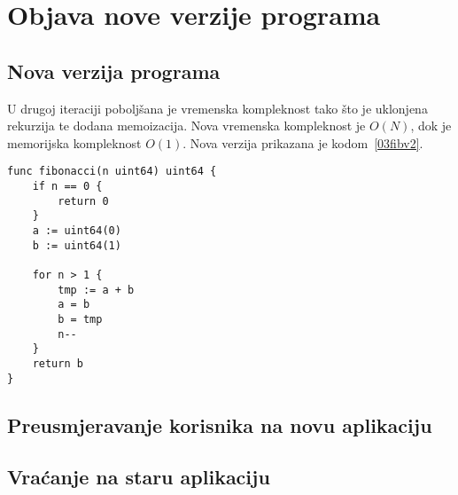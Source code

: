 \chapter{Objava nove verzije programa}

\section{Nova verzija programa}
U drugoj iteraciji poboljšana je vremenska kompleknost tako što je uklonjena rekurzija te dodana
memoizacija. Nova vremenska kompleknost je $O(N)$, dok je memorijska kompleknost $O(1)$. Nova
verzija prikazana je kodom~\ref{03fibv2}.

\begin{lstlisting}
func fibonacci(n uint64) uint64 {
	if n == 0 {
		return 0
	}
	a := uint64(0)
	b := uint64(1)

	for n > 1 {
		tmp := a + b
		a = b
		b = tmp
		n--
	}
	return b
}
\end{lstlisting}

\section{Preusmjeravanje korisnika na novu aplikaciju}

\section{Vraćanje na staru aplikaciju}
